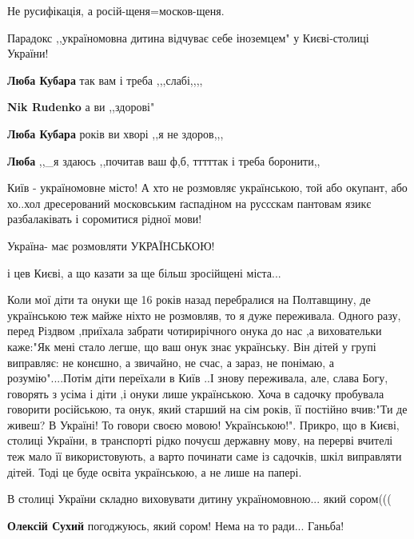\begin{itemize}
Не русифікація, а росій-щеня=москов-щеня.

Парадокс ,,україномовна дитина відчуває себе іноземцем" у Києві-столиці України!

\begin{itemize} %
\textbf{Люба Кубара} так вам і треба ,,,слабі,,,,

\textbf{Nik Rudenko} а ви ,,здорові"

\textbf{Люба Кубара} років ви хворі ,,я не здоров,,,

\textbf{Люба} ,,\_я здаюсь ,,почитав ваш ф,б, тттттак і треба боронити,,
\end{itemize} %


Київ - україномовне місто! А хто не розмовляє українською, той або окупант, або
хо..хол дресерований московським ґаспадіном на руссскам пантовам язикє
разбалаківать і соромитися рідної мови!

Україна- має розмовляти УКРАЇНСЬКОЮ!

і цев Києві, а що казати за ще більш зросійщені міста...


Коли мої діти та онуки ще 16 років назад перебралися на Полтавщину, де
українською теж майже ніхто не розмовляв, то я дуже переживала. Одного разу,
перед Різдвом ,приїхала забрати чотирирічного онука до нас ,а виховательки
каже:"Як мені стало легше, що ваш онук знає українську. Він дітей у групі
виправляє: не конєшно, а звичайно, не счас, а зараз, не понімаю, а
розумію"....Потім діти переїхали в Київ ..І знову переживала, але, слава Богу,
говорять з усіма і діти ,і онуки лише українською. Хоча в садочку пробувала
говорити російською, та онук, який старший на сім років, її постійно вчив:"Ти де
живеш? В Україні! То говори своєю мовою! Українською!". Прикро, що в Києві,
столиці України, в транспорті рідко почуєш державну мову, на перерві вчителі
теж мало її використовують, а варто починати саме із садочків, шкіл виправляти
дітей. Тоді це буде освіта українською, а не лише на папері.


В столиці України складно виховувати дитину україномовною... який сором(((

\begin{itemize} %
\textbf{Олексій Сухий} погоджуюсь, який сором!
Нема на то ради... Ганьба!


\end{itemize}
\end{itemize}
